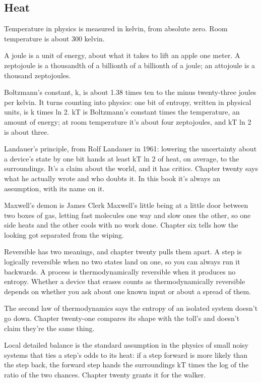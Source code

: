 \documentclass[11pt,twoside]{article}
\theoremstyle{thielethm}
\theoremstyle{thieledef}
\theoremstyle{thieledef}
\theoremstyle{thieledef}
\theoremstyle{thielethm}
\theoremstyle{thieleobs}
\theoremstyle{thielethm}
\begin{document}
\subsection{Heat}

Temperature in physics is measured in kelvin, from absolute zero. Room temperature is about 300 kelvin.

A joule is a unit of energy, about what it takes to lift an apple one meter. A zeptojoule is a thousandth of a billionth of a billionth of a joule; an attojoule is a thousand zeptojoules.

Boltzmann's constant, k, is about 1.38 times ten to the minus twenty-three joules per kelvin. It turns counting into physics: one bit of entropy, written in physical units, is k times ln 2. kT is Boltzmann's constant times the temperature, an amount of energy; at room temperature it's about four zeptojoules, and kT ln 2 is about three.

Landauer's principle, from Rolf Landauer in 1961: lowering the uncertainty about a device's state by one bit hands at least kT ln 2 of heat, on average, to the surroundings. It's a claim about the world, and it has critics. Chapter twenty says what he actually wrote and who doubts it. In this book it's always an assumption, with its name on it.

Maxwell's demon is James Clerk Maxwell's little being at a little door between two boxes of gas, letting fast molecules one way and slow ones the other, so one side heats and the other cools with no work done. Chapter six tells how the looking got separated from the wiping.

Reversible has two meanings, and chapter twenty pulls them apart. A step is logically reversible when no two states land on one, so you can always run it backwards. A process is thermodynamically reversible when it produces no entropy. Whether a device that erases counts as thermodynamically reversible depends on whether you ask about one known input or about a spread of them.

The second law of thermodynamics says the entropy of an isolated system doesn't go down. Chapter twenty-one compares its shape with the toll's and doesn't claim they're the same thing.

Local detailed balance is the standard assumption in the physics of small noisy systems that ties a step's odds to its heat: if a step forward is more likely than the step back, the forward step hands the surroundings kT times the log of the ratio of the two chances. Chapter twenty grants it for the walker.
\end{document}
